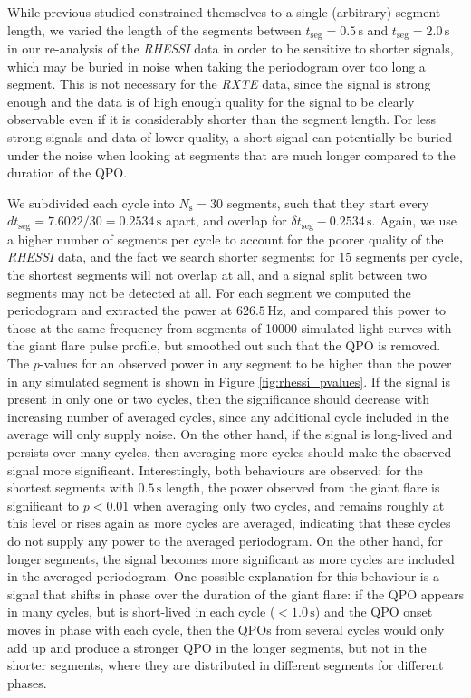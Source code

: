 \documentclass{emulateapj}
\begin{document}
While previous studied constrained themselves to a single (arbitrary) segment length, we varied the length of the segments between $t_{\mathrm{seg}} = 0.5 \, \mathrm{s}$ and $t_{\mathrm{seg}} = 2.0 \, \mathrm{s}$ in our re-analysis of the {\it RHESSI} data in order to be sensitive to shorter signals, which may be buried in noise when taking the periodogram over too long a segment. This is not necessary for the {\it RXTE} data, since the signal is strong enough and the data is of high enough quality for the signal to be clearly observable even if it is considerably shorter than the segment length. For less strong signals and data of lower quality, a short signal can potentially be buried under the noise when looking at segments that are much longer compared to the duration of the QPO. 

We subdivided each cycle into $N_\mathrm{s} = 30$ segments, such that they start every $d t_\mathrm{seg}= 7.6022/30 = 0.2534 \, \mathrm{s}$ apart, and overlap for $\delta t_\mathrm{seg} - 0.2534 \, \mathrm{s}$. Again, we use a higher number of segments per cycle to account for the poorer quality of the {\it RHESSI} data, and the fact we search shorter segments: for $15$ segments per cycle, the shortest segments will not overlap at all, and a signal split between two segments may not be detected at all.
For each segment we computed the periodogram and extracted the power at $626.5 \, \mathrm{Hz}$, and compared this power to those at the same frequency from segments of 10000 simulated light curves with the giant flare pulse profile, but smoothed out such that the QPO is removed. The $p$-values for an observed power in any segment to be higher than the power in any simulated segment is shown in Figure \ref{fig:rhessi_pvalues}. If the signal is present in only one or two cycles, then the significance should decrease with increasing number of averaged cycles, since any additional cycle included in the average will only supply noise. On the other hand, if the signal is long-lived and persists over many cycles, then averaging more cycles should make the observed signal more significant. Interestingly, both behaviours are observed: for the shortest segments with $0.5\, \mathrm{s}$ length, the power observed from the giant flare is significant to $p < 0.01$ when averaging only two cycles, and remains roughly at this level or rises again as more cycles are averaged, indicating that these cycles do not supply any power to the averaged periodogram. On the other hand, for longer segments, the signal becomes more significant as more cycles are included in the averaged periodogram. One possible explanation for this behaviour is a signal that shifts in phase over the duration of the giant flare: if the QPO appears in many cycles, but is short-lived in each cycle ($<1.0 \, \mathrm{s}$) and the QPO onset moves in phase with each cycle, then the QPOs from several cycles would only add up and produce a stronger QPO in the longer segments, but not in the shorter segments, where they are distributed in different segments for different phases. 
\end{document}
